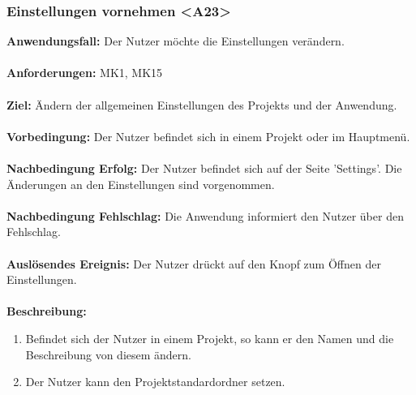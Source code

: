 \documentclass[parskip=full]{scrartcl} %
\begin{document}
\subsubsection*{Einstellungen vornehmen <A23>}
\textbf{Anwendungsfall:} Der Nutzer möchte die Einstellungen verändern.\\\\
\textbf{Anforderungen:} MK1, MK15\\\\
\textbf{Ziel:} Ändern der allgemeinen Einstellungen des Projekts und der Anwendung. \\\\
\textbf{Vorbedingung:} Der Nutzer befindet sich in einem Projekt oder im Hauptmenü.\\\\
\textbf{Nachbedingung Erfolg:} Der Nutzer befindet sich auf der Seite 'Settings'. Die Änderungen an den Einstellungen sind vorgenommen. \\\\
\textbf{Nachbedingung Fehlschlag:} Die Anwendung informiert den Nutzer über den Fehlschlag. \\\\
\textbf{Auslösendes Ereignis:} Der Nutzer drückt auf den Knopf zum Öffnen der Einstellungen. \\\\
\textbf{Beschreibung:}
\begin{enumerate}
    \item Befindet sich der Nutzer in einem Projekt, so kann er den Namen und die Beschreibung von diesem ändern.
    \item Der Nutzer kann den Projektstandardordner setzen.
\end{enumerate}
\newpage
\end{document}
